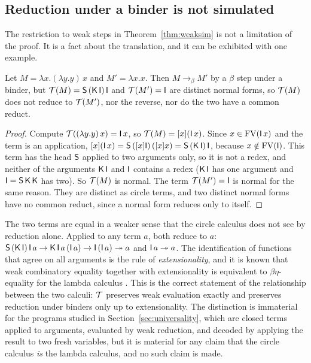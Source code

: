 \subsection{Reduction under a binder is not simulated}

The restriction to weak steps in Theorem~\ref{thm:weaksim} is not a limitation of the proof. It is a fact about the translation, and it can be exhibited with one example.

\begin{proposition}\label{prop:xi}
Let $M=\lambda x.(\lambda y.y)\,x$ and $M'=\lambda x.x$. Then $M\to_\beta M'$ by a $\beta$ step under a binder, but $\mathcal{T}(M)=\mathsf{S}\,(\mathsf{K}\,\mathsf{I})\,\mathsf{I}$ and $\mathcal{T}(M')=\mathsf{I}$ are distinct normal forms, so $\mathcal{T}(M)$ does not reduce to $\mathcal{T}(M')$, nor the reverse, nor do the two have a common reduct.
\end{proposition}

\begin{proof}
Compute $\mathcal{T}((\lambda y.y)\,x)=\mathsf{I}\,x$, so $\mathcal{T}(M)=[x](\mathsf{I}\,x)$. Since $x\in\mathrm{FV}(\mathsf{I}\,x)$ and the term is an application, $[x](\mathsf{I}\,x)=\mathsf{S}\,([x]\mathsf{I})\,([x]x)=\mathsf{S}\,(\mathsf{K}\,\mathsf{I})\,\mathsf{I}$, because $x\notin\mathrm{FV}(\mathsf{I})$. This term has the head $\mathsf{S}$ applied to two arguments only, so it is not a redex, and neither of the arguments $\mathsf{K}\,\mathsf{I}$ and $\mathsf{I}$ contains a redex ($\mathsf{K}\,\mathsf{I}$ has one argument and $\mathsf{I}=\mathsf{S}\,\mathsf{K}\,\mathsf{K}$ has two). So $\mathcal{T}(M)$ is normal. The term $\mathcal{T}(M')=\mathsf{I}$ is normal for the same reason. They are distinct as circle terms, and two distinct normal forms have no common reduct, since a normal form reduces only to itself.
\end{proof}

The two terms are equal in a weaker sense that the circle calculus does not see by reduction alone. Applied to any term $a$, both reduce to $a$: $\mathsf{S}\,(\mathsf{K}\,\mathsf{I})\,\mathsf{I}\,a\rightarrow\mathsf{K}\,\mathsf{I}\,a\,(\mathsf{I}\,a)\rightarrow\mathsf{I}\,(\mathsf{I}\,a)\twoheadrightarrow a$ and $\mathsf{I}\,a\twoheadrightarrow a$. The identification of functions that agree on all arguments is the rule of \emph{extensionality}, and it is known that weak combinatory equality together with extensionality is equivalent to $\beta\eta$-equality for the lambda calculus \cite{curry-feys,hindley-seldin,barendregt}. This is the correct statement of the relationship between the two calculi: $\mathcal{T}$ preserves weak evaluation exactly and preserves reduction under binders only up to extensionality. The distinction is immaterial for the programs studied in Section~\ref{sec:universality}, which are closed terms applied to arguments, evaluated by weak reduction, and decoded by applying the result to two fresh variables, but it is material for any claim that the circle calculus \emph{is} the lambda calculus, and no such claim is made.


